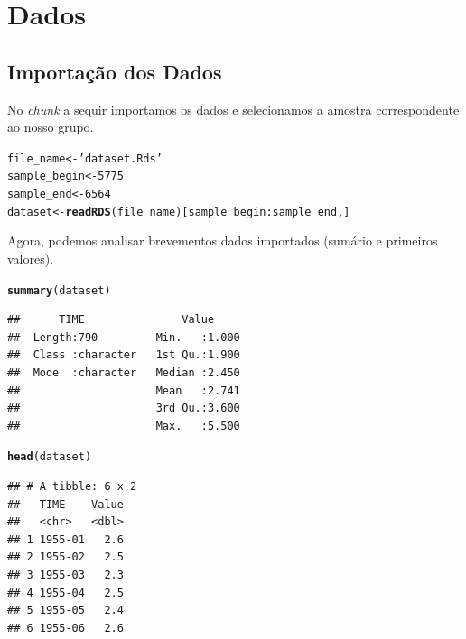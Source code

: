 \documentclass{article}\usepackage[]{graphicx}\usepackage[]{color}
\makeatletter
\newcommand{\hlnum}[1]{\textcolor[rgb]{0.686,0.059,0.569}{#1}}%
\newcommand{\hlstr}[1]{\textcolor[rgb]{0.192,0.494,0.8}{#1}}%
\newcommand{\hlopt}[1]{\textcolor[rgb]{0,0,0}{#1}}%
\newcommand{\hlstd}[1]{\textcolor[rgb]{0.345,0.345,0.345}{#1}}%
\newcommand{\hlkwb}[1]{\textcolor[rgb]{0.69,0.353,0.396}{#1}}%
\newcommand{\hlkwd}[1]{\textcolor[rgb]{0.737,0.353,0.396}{\textbf{#1}}}%
\newenvironment{kframe}{%
 \def\at@end@of@kframe{}%
 \ifinner\ifhmode%
  \def\at@end@of@kframe{\end{minipage}}%
  \begin{minipage}{\columnwidth}%
 \fi\fi%
 \def\FrameCommand##1{\hskip\@totalleftmargin \hskip-\fboxsep
 \colorbox{shadecolor}{##1}\hskip-\fboxsep
     \hskip-\linewidth \hskip-\@totalleftmargin \hskip\columnwidth}%
 \MakeFramed {\advance\hsize-\width
   \@totalleftmargin\z@ \linewidth\hsize
   \@setminipage}}%
 {\par\unskip\endMakeFramed%
 \at@end@of@kframe}
\newenvironment{knitrout}{}{} %
\makeatother
\begin{document}
\section{Dados}

\subsection{Importação dos Dados}

No \textit{chunk} a sequir importamos os dados e selecionamos a amostra correspondente ao nosso grupo.

\begin{knitrout}
\color{fgcolor}\begin{kframe}
\begin{alltt}
\hlstd{file_name}    \hlkwb{<-} \hlstr{'dataset.Rds'}
\hlstd{sample_begin} \hlkwb{<-} \hlnum{5775}
\hlstd{sample_end}   \hlkwb{<-} \hlnum{6564}
\hlstd{dataset}      \hlkwb{<-} \hlkwd{readRDS}\hlstd{(file_name)[sample_begin}\hlopt{:}\hlstd{sample_end,]}
\end{alltt}
\end{kframe}
\end{knitrout}
  
  Agora, podemos analisar brevementos dados importados (sumário e primeiros valores).

\begin{knitrout}
\color{fgcolor}\begin{kframe}
\begin{alltt}
\hlkwd{summary}\hlstd{(dataset)}
\end{alltt}
\begin{verbatim}
##      TIME               Value      
##  Length:790         Min.   :1.000  
##  Class :character   1st Qu.:1.900  
##  Mode  :character   Median :2.450  
##                     Mean   :2.741  
##                     3rd Qu.:3.600  
##                     Max.   :5.500
\end{verbatim}
\begin{alltt}
\hlkwd{head}\hlstd{(dataset)}
\end{alltt}
\begin{verbatim}
## # A tibble: 6 x 2
##   TIME    Value
##   <chr>   <dbl>
## 1 1955-01   2.6
## 2 1955-02   2.5
## 3 1955-03   2.3
## 4 1955-04   2.5
## 5 1955-05   2.4
## 6 1955-06   2.6
\end{verbatim}
\end{kframe}
\end{knitrout}
  
\end{document}
